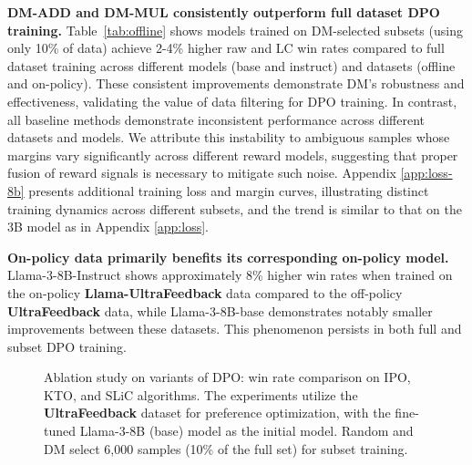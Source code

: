 {\textbf{DM-ADD and DM-MUL consistently outperform full dataset DPO training.} Table~\ref{tab:offline} shows models trained on DM-selected subsets (using only 10\% of data) achieve 2-4\% higher raw and LC win rates compared to full dataset training across different models (base and instruct) and datasets (offline and on-policy). These consistent improvements demonstrate DM's robustness and effectiveness, validating the value of data filtering for DPO training. In contrast, all baseline methods demonstrate inconsistent performance across different datasets and models. We attribute this instability to ambiguous samples whose margins vary significantly across different reward models, suggesting that proper fusion of reward signals is necessary to mitigate such noise. Appendix \ref{app:loss-8b} presents additional training loss and margin curves, illustrating distinct training dynamics across different subsets, and the trend is similar to that on the 3B model as in Appendix \ref{app:loss}.

\textbf{On-policy data primarily benefits its corresponding on-policy model.} Llama-3-8B-Instruct shows approximately 8\% higher win rates when trained on the on-policy \textbf{Llama-UltraFeedback} data compared to the off-policy \textbf{UltraFeedback} data, while Llama-3-8B-base demonstrates notably smaller improvements between these datasets. 
This phenomenon persists in both full and subset DPO training.

\begin{figure*}[t]
	\centering
        \vspace{-10pt}
	\caption{Ablation study on variants of DPO: win rate comparison on IPO, KTO, and SLiC algorithms. The experiments utilize the \textbf{UltraFeedback} dataset for preference optimization, with the fine-tuned Llama-3-8B (base) model as the initial model. Random and DM select 6,000 samples (10\% of the full set) for subset training.
	}
	\label{fig:abl_po}
	\vspace{-5pt}
\end{figure*}


}
